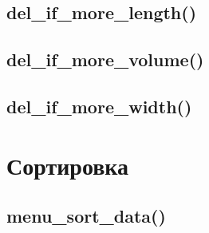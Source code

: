 \documentclass[12pt, a4paper]{article}
\begin{document}

\subsection{del\_if\_more\_length()}






\subsection{del\_if\_more\_volume()}






\subsection{del\_if\_more\_width()}






\section{Сортировка}


\subsection{menu\_sort\_data()}
\end{document}
